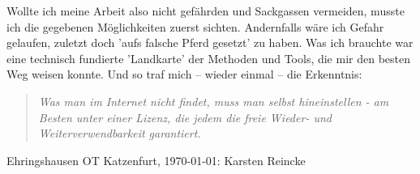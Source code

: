 Wollte ich meine Arbeit also nicht gefährden und Sackgassen vermeiden, musste ich die gegebenen Möglichkeiten zuerst sichten. Andernfalls wäre ich Gefahr gelaufen, zuletzt doch 'aufs falsche Pferd gesetzt' zu haben. Was ich brauchte war eine technisch fundierte 'Landkarte' der Methoden und Tools, die mir den besten Weg weisen konnte. Und so traf mich -- wieder einmal -- die Erkenntnis:

\begin{quote}\textit{Was man im Internet nicht findet, muss man selbst hineinstellen - am Besten unter einer Lizenz, die jedem die freie Wieder- und Weiterverwendbarkeit garantiert.} \end{quote}

\begin{flushright}
Ehringshausen OT Katzenfurt, \today: Karsten Reincke
\end{flushright}
%

